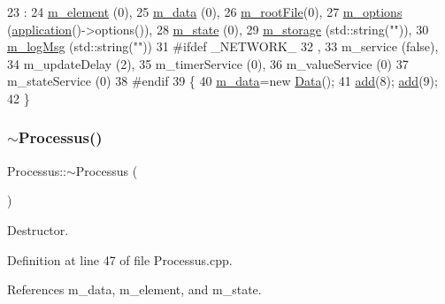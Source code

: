\begin{DoxyCode}
23                        : 
24   \hyperlink{classProcessus_aa9d24d53c3e52f36786cabb5d8e296e7}{m\_element} (0),
25   \hyperlink{classProcessus_a3da9a9de8af54e2f47807a3e09dfccff}{m\_data}    (0),
26   \hyperlink{classProcessus_a76114f8cf2111e910c323a7ae05a015d}{m\_rootFile}(0),
27   \hyperlink{classProcessus_a74205f3c1e00c4448f7b3257c2351797}{m\_options} (\hyperlink{Tools_8h_a27885a3c35afe79029fb830f32f66458}{application}()->options()),
28   \hyperlink{classProcessus_ab3539eee42891ceae0baf4395ae7fb61}{m\_state}   (0),
29   \hyperlink{classProcessus_a132b1e71f72327e5a87f0a168c7b6325}{m\_storage} (std::string(\textcolor{stringliteral}{""})),
30   \hyperlink{classProcessus_a3bc0140a3a69a83951ab7f9986bd2c84}{m\_logMsg}  (std::string(\textcolor{stringliteral}{""}))
31 \textcolor{preprocessor}{#ifdef \_NETWORK\_}
32   ,  
33   m\_service (\textcolor{keyword}{false}),
34   m\_updateDelay  (2),
35   m\_timerService (0),
36   m\_valueService (0)  
37   m\_stateService (0)
38 \textcolor{preprocessor}{#endif  }
39 \{
40   \hyperlink{classProcessus_a3da9a9de8af54e2f47807a3e09dfccff}{m\_data}=\textcolor{keyword}{new} \hyperlink{classData}{Data}();
41   \hyperlink{classAttrib_a235f773af19c900264a190b00a3b4ad7}{add}(8); \hyperlink{classAttrib_a235f773af19c900264a190b00a3b4ad7}{add}(9);
42 \}
\end{DoxyCode}
\mbox{\label{classProcessus_a3ec6c9d6ef9e7a6db07f66924561f2ee}} 
\subsubsection{\texorpdfstring{$\sim$\+Processus()}{~Processus()}}
{\footnotesize\ttfamily Processus\+::$\sim$\+Processus (\begin{DoxyParamCaption}{ }\end{DoxyParamCaption})\hspace{0.3cm}{\ttfamily [virtual]}}



Destructor. 



Definition at line 47 of file Processus.\+cpp.



References m\+\_\+data, m\+\_\+element, and m\+\_\+state.


